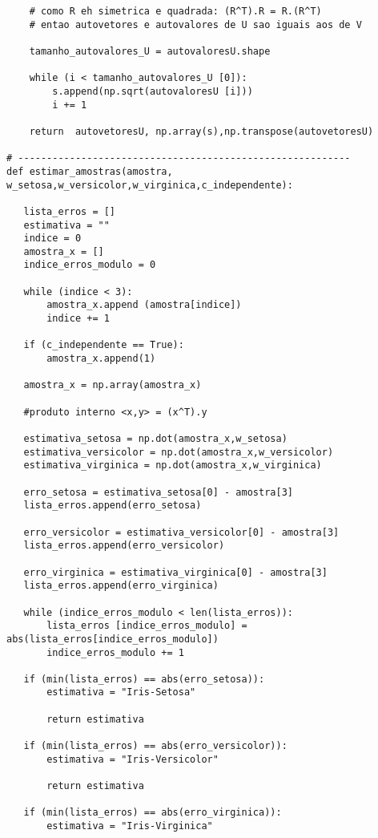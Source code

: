 \documentclass[a4paper,12pt,twoside]{article}
\begin{document}
\begin{lstlisting}
    # como R eh simetrica e quadrada: (R^T).R = R.(R^T)
    # entao autovetores e autovalores de U sao iguais aos de V
    
    tamanho_autovalores_U = autovaloresU.shape
      
    while (i < tamanho_autovalores_U [0]):       
        s.append(np.sqrt(autovaloresU [i]))
        i += 1
    
    return  autovetoresU, np.array(s),np.transpose(autovetoresU)

# ----------------------------------------------------------
def estimar_amostras(amostra, w_setosa,w_versicolor,w_virginica,c_independente):
    
   lista_erros = []
   estimativa = ""
   indice = 0
   amostra_x = []
   indice_erros_modulo = 0
   
   while (indice < 3):
       amostra_x.append (amostra[indice])
       indice += 1
       
   if (c_independente == True):
       amostra_x.append(1)
      
   amostra_x = np.array(amostra_x)
   
   #produto interno <x,y> = (x^T).y
   
   estimativa_setosa = np.dot(amostra_x,w_setosa)
   estimativa_versicolor = np.dot(amostra_x,w_versicolor)
   estimativa_virginica = np.dot(amostra_x,w_virginica)
   
   erro_setosa = estimativa_setosa[0] - amostra[3]
   lista_erros.append(erro_setosa)
   
   erro_versicolor = estimativa_versicolor[0] - amostra[3]
   lista_erros.append(erro_versicolor)
   
   erro_virginica = estimativa_virginica[0] - amostra[3]
   lista_erros.append(erro_virginica)
   
   while (indice_erros_modulo < len(lista_erros)):
       lista_erros [indice_erros_modulo] = abs(lista_erros[indice_erros_modulo])
       indice_erros_modulo += 1
   
   if (min(lista_erros) == abs(erro_setosa)):
       estimativa = "Iris-Setosa"
       
       return estimativa
   
   if (min(lista_erros) == abs(erro_versicolor)):
       estimativa = "Iris-Versicolor"
       
       return estimativa
   
   if (min(lista_erros) == abs(erro_virginica)):
       estimativa = "Iris-Virginica"
       

\end{lstlisting}
\end{document}
